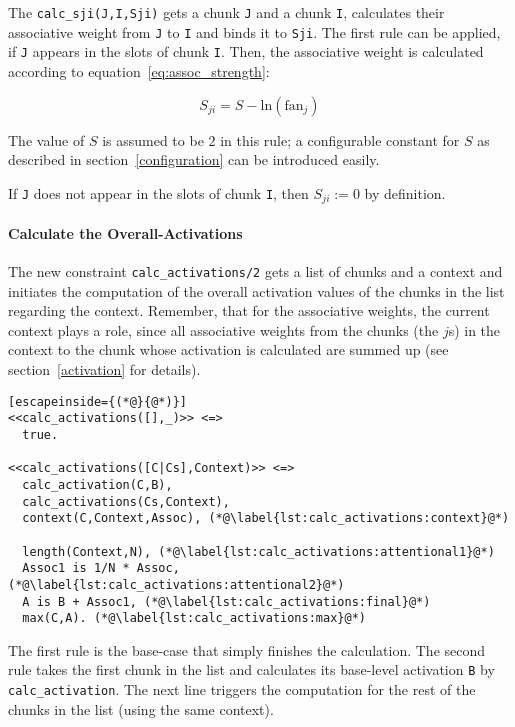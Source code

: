 The \lstinline|calc_sji(J,I,Sji)| gets a chunk \lstinline|J| and a chunk \lstinline|I|, calculates their associative weight from \lstinline|J| to \lstinline|I| and binds it to \lstinline|Sji|. The first rule can be applied, if \lstinline|J| appears in the slots of chunk \lstinline|I|. Then, the associative weight is calculated according to equation~\eqref{eq:assoc_strength}:

\begin{equation*}
S_{ji} = S - \mathrm{ln}(\mathrm{fan}_j) 
\end{equation*}

The value of $S$ is assumed to be $2$ in this rule; a configurable constant for $S$ as described in section~\ref{configuration} can be introduced easily.

If \lstinline|J| does not appear in the slots of chunk \lstinline|I|, then $S_{ji} := 0$ by definition.

\paragraph{Calculate the Overall-Activations}

The new constraint \lstinline|calc_activations/2| gets a list of chunks and a context and initiates the computation of the overall activation values of the chunks in the list regarding the context. Remember, that for the associative weights, the current context plays a role, since all associative weights from the chunks (the $j$s) in the context to the chunk whose activation is calculated are summed up (see section~\ref{activation} for details).

\begin{lstlisting}[escapeinside={(*@}{@*)}]
<<calc_activations([],_)>> <=>
  true.
  
<<calc_activations([C|Cs],Context)>> <=> 
  calc_activation(C,B), 
  calc_activations(Cs,Context), 
  context(C,Context,Assoc), (*@\label{lst:calc_activations:context}@*)
  
  length(Context,N), (*@\label{lst:calc_activations:attentional1}@*)
  Assoc1 is 1/N * Assoc, (*@\label{lst:calc_activations:attentional2}@*)
  A is B + Assoc1, (*@\label{lst:calc_activations:final}@*)
  max(C,A). (*@\label{lst:calc_activations:max}@*)
\end{lstlisting}

The first rule is the base-case that simply finishes the calculation. The second rule takes the first chunk in the list and calculates its base-level activation \lstinline|B| by \lstinline|calc_activation|. The next line triggers the computation for the rest of the chunks in the list (using the same context).

